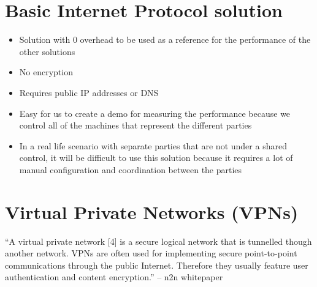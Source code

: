 \hypertarget{basic-internet-protocol-solution}{%
\section{Basic Internet Protocol
solution}\label{basic-internet-protocol-solution}}

\begin{itemize}
\tightlist
\item
  Solution with 0 overhead to be used as a reference for the performance
  of the other solutions
\item
  No encryption
\item
  Requires public IP addresses or DNS
\item
  Easy for us to create a demo for measuring the performance because we
  control all of the machines that represent the different parties
\item
  In a real life scenario with separate parties that are not under a
  shared control, it will be difficult to use this solution because it
  requires a lot of manual configuration and coordination between the
  parties
\end{itemize}

\hypertarget{virtual-private-networks-vpns}{%
\section{Virtual Private Networks
(VPNs)}\label{virtual-private-networks-vpns}}

``A virtual private network {[}4{]} is a secure logical network that is
tunnelled though another network. VPNs are often used for implementing
secure point-to-point communications through the public Internet.
Therefore they usually feature user authentication and content
encryption.'' -- n2n whitepaper

